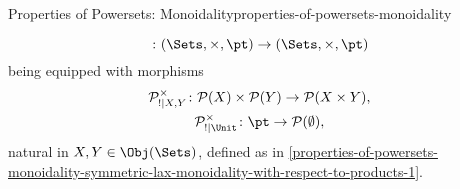 \begin{proposition}{Properties of Powersets: Monoidality}{properties-of-powersets-monoidality}
\begin{enumerate}
\[                \colon
                (\Sets,\times,\pt)
                \to
                (\Sets,\times,\pt)
            \]%
            being equipped with morphisms%
            \[
                \begin{gathered}
                    \mathcal{P}^{\times}_{!|X,Y}   \colon \mathcal{P}(X)\times\mathcal{P}(Y) \to \mathcal{P}(X\times Y),\\
                    \mathcal{P}^{\times}_{!|\Unit} \colon \pt                                \to \mathcal{P}(\emptyset),
                \end{gathered}
            \]%
            natural in $X,Y\in\Obj(\Sets)$, defined as in \cref{properties-of-powersets-monoidality-symmetric-lax-monoidality-with-respect-to-products-1}.
    \end{enumerate}
\end{proposition}
